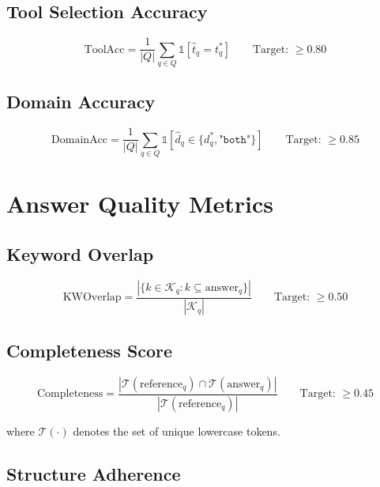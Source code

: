 \documentclass[12pt,a4paper]{report}
\begin{document}
\subsection{Tool Selection Accuracy}

\begin{equation}
  \text{ToolAcc} = \frac{1}{|Q|}\sum_{q\in Q}\mathbb{1}[\hat{t}_q = t_q^*] \qquad \text{Target: } \geq 0.80
\end{equation}

\subsection{Domain Accuracy}

\begin{equation}
  \text{DomainAcc} = \frac{1}{|Q|}\sum_{q\in Q}\mathbb{1}[\hat{d}_q \in \{d_q^*,\texttt{"both"}\}] \qquad \text{Target: } \geq 0.85
\end{equation}

\section{Answer Quality Metrics}

\subsection{Keyword Overlap}

\begin{equation}
  \text{KWOverlap} = \frac{|\{k \in \mathcal{K}_q : k \subseteq \text{answer}_q\}|}{|\mathcal{K}_q|} \qquad \text{Target: } \geq 0.50
\end{equation}

\subsection{Completeness Score}

\begin{equation}
  \text{Completeness} = \frac{|\mathcal{T}(\text{reference}_q)\cap\mathcal{T}(\text{answer}_q)|}{|\mathcal{T}(\text{reference}_q)|} \qquad \text{Target: } \geq 0.45
\end{equation}

where $\mathcal{T}(\cdot)$ denotes the set of unique lowercase tokens.

\subsection{Structure Adherence}
\end{document}
